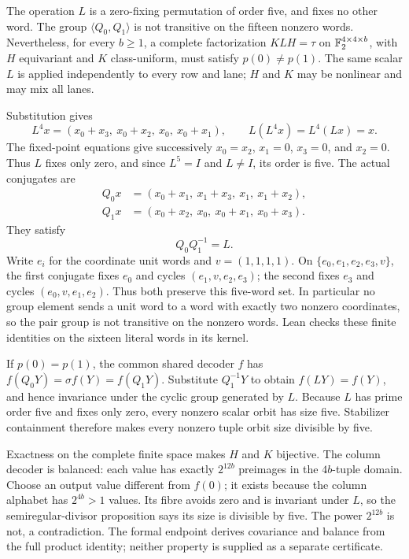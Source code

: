 \begin{theorem}
\label{thm:order-five-example}
The operation $L$ is a zero-fixing permutation of order five, and fixes
no other word.  The group $\langle Q_0,Q_1\rangle$ is not transitive
on the fifteen nonzero words.
Nevertheless, for every $b\ge1$, a complete factorization
$KLH=\tau$ on $\mathbb{F}_2^{4\times4\times b}$, with $H$ equivariant and
$K$ class-uniform, must satisfy $p(0)\ne p(1)$.
The same scalar $L$ is applied independently to every row and lane;
$H$ and $K$ may be nonlinear and may mix all lanes.
\end{theorem}
\begin{outline}
Substitution gives
\[
 L^4x=(x_0+x_3,\ x_0+x_2,\ x_0,\ x_0+x_1),
 \qquad L(L^4x)=L^4(Lx)=x.
\]
The fixed-point equations give successively $x_0=x_2$, $x_1=0$,
$x_3=0$, and $x_2=0$.  Thus $L$ fixes only zero, and since
$L^5=I$ and $L\ne I$, its order is five.  The actual conjugates are
\[
 \begin{aligned}
 Q_0x&=(x_0+x_1,\ x_1+x_3,\ x_1,\ x_1+x_2),\\
 Q_1x&=(x_0+x_2,\ x_0,\ x_0+x_1,\ x_0+x_3).
 \end{aligned}
\]
They satisfy
\[
 Q_0Q_1^{-1}=L.
\]
Write $e_i$ for the coordinate unit words and $v=(1,1,1,1)$.
On $\{e_0,e_1,e_2,e_3,v\}$, the first conjugate fixes $e_0$
and cycles $(e_1,v,e_2,e_3)$; the second fixes $e_3$ and cycles
$(e_0,v,e_1,e_2)$.  Thus both preserve this five-word set.  In particular no group element sends
a unit word to a word with exactly two nonzero coordinates, so the pair
group is not transitive on the nonzero words.  Lean checks these finite
identities on the sixteen literal words in its kernel.

If $p(0)=p(1)$, the common shared decoder $f$ has
$f(Q_0Y)=\sigma f(Y)=f(Q_1Y)$.  Substitute $Q_1^{-1}Y$ to obtain
$f(LY)=f(Y)$, and hence invariance under the cyclic group generated by
$L$.  Because $L$ has prime order five and fixes only zero, every
nonzero scalar orbit has size five.  Stabilizer containment therefore
makes every nonzero tuple orbit size divisible by five.

Exactness on the complete finite space makes $H$ and $K$ bijective.
The column decoder is balanced: each value has exactly
$2^{12b}$ preimages in the $4b$-tuple domain.
Choose an output value different from $f(0)$; it exists because the
column alphabet has $2^{4b}>1$ values.  Its fibre avoids zero and is
invariant under $L$, so the semiregular-divisor proposition says its
size is divisible by five.  The power $2^{12b}$ is not, a contradiction.
The formal endpoint derives covariance and balance from the full product
identity; neither property is supplied as a separate certificate.
\end{outline}

